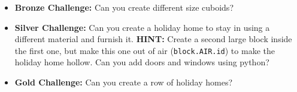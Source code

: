 \documentclass{geocraft-worksheet}
\begin{document}
\begin{itemize}
\item\noindent\textbf{Bronze Challenge:} Can you create different size
cuboids?  

\item\noindent\textbf{Silver Challenge:} Can you create a holiday home to stay in
using a different material and furnish it. \textbf{HINT:} Create a
second large block inside the first one, but make this one out of air
(\lstinline{block.AIR.id}) to make the holiday home hollow. Can you
add doors and windows using python?

\item\noindent\textbf{Gold Challenge:} Can you create a row of holiday homes?
\end{itemize}
\end{document}
